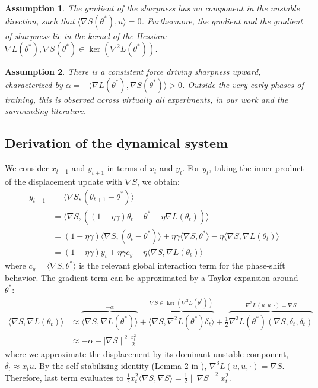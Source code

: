 \documentclass{article}
\newtheorem{assumption}{Assumption}
\begin{document}
\begin{assumption}
The gradient of the sharpness has no component in the unstable direction, such that $\langle \nabla S(\theta^*), u \rangle = 0$. Furthermore, the gradient and the gradient of sharpness lie in the kernel of the Hessian: $\nabla L(\theta^*), \nabla S(\theta^*) \in \ker(\nabla^2 L(\theta^*))$.
\end{assumption}

\begin{assumption}
There is a consistent force driving sharpness upward, characterized by $\alpha = -\langle \nabla L(\theta^*), \nabla S(\theta^*) \rangle > 0$. Outside the very early phases of training, this is observed across virtually all experiments, in our work and the surrounding literature.
\end{assumption}

\subsection{Derivation of the dynamical system}
\label{app:model_update_rules}

We consider $x_{t+1}$ and $y_{t+1}$ in terms of $x_t$ and $y_t$. For $y_t$, taking the inner product of the displacement update with $\nabla S$, we obtain:
\begin{align*}
    y_{t+1}&=\langle\nabla S,(\theta_{t+1}-\theta^*)\rangle\\
    &=\langle \nabla S,\left((1-\eta\gamma)\theta_{t}-\theta^*-\eta\nabla L(\theta_t)\right)\rangle\\
    &=(1-\eta\gamma)\langle\nabla S,(\theta_t-\theta^*)\rangle+\eta\gamma\langle\nabla S,\theta^*\rangle-\eta\langle\nabla S,\nabla L(\theta_t)\rangle\\
    &=(1-\eta\gamma)y_t+\eta\gamma c_y-\eta\langle\nabla S,\nabla L (\theta_t)\rangle
\end{align*}
where $c_y=\langle\nabla S,\theta^*\rangle$ is the relevant global interaction term for the phase-shift behavior.
The gradient term can be approximated by a Taylor expansion around $\theta^*$:
\begin{align*}
    \langle \nabla S, \nabla L(\theta_t) \rangle &\approx \overbrace{\langle \nabla S, \nabla L(\theta^*) \rangle}^{-\alpha} + \overbrace{\langle \nabla S, \nabla^2 L(\theta^*) \delta_t \rangle}^{\nabla S\in\ker\left(\nabla^2 L(\theta^*)\right)} + \frac{1}{2}\overbrace{\nabla^3 L(\theta^*)(\nabla S, \delta_t, \delta_t)}^{\nabla^3L(u,u,\cdot)=\nabla S}\\
    &\approx-\alpha+|\nabla S\|^2\frac{x^2_t}{2}
\end{align*}
where we approximate the displacement by its dominant unstable component, $\delta_t \approx x_t u$. By the self-stabilizing identity (Lemma 2 in \citep{damian_selfstab}), $\nabla^3 L(u, u, \cdot) = \nabla S$. Therefore, last term evaluates to $\frac{1}{2} x_t^2 \langle \nabla S, \nabla S \rangle = \frac{1}{2} \|\nabla S\|^2 x_t^2$.
\end{document}
